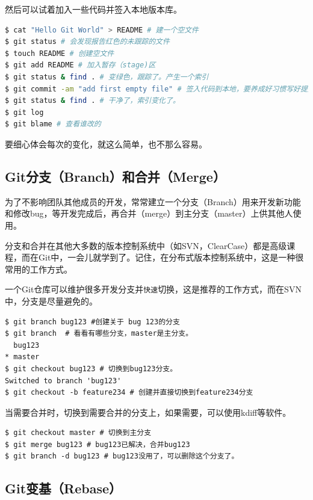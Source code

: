 然后可以试着加入一些代码并签入本地版本库。

\begin{lstlisting}[language=bash]
$ cat "Hello Git World" > README # 建一个空文件
$ git status # 会发现报告红色的未跟踪的文件
$ touch README # 创建空文件
$ git add README # 加入暂存（stage)区
$ git status & find . # 变绿色，跟踪了。产生一个索引
$ git commit -am "add first empty file" # 签入代码到本地，要养成好习惯写好提交的注释。
$ git status & find . # 干净了，索引变化了。
$ git log
$ git blame # 查看谁改的
\end{lstlisting}

要细心体会每次的变化，就这么简单，也不那么容易。

\subsection{Git分支（Branch）和合并（Merge）}
\label{git分支（branch）和合并（merge）}

为了不影响团队其他成员的开发，常常建立一个分支（Branch）用来开发新功能和修改bug，等开发完成后，再合并（merge）到主分支（master）上供其他人使用。

分支和合并在其他大多数的版本控制系统中（如SVN，ClearCase）都是高级课程，而在Git中，一会儿就学到了。记住，在分布式版本控制系统中，这是一种很常用的工作方式。

一个Git仓库可以维护很多开发分支并\texttt{快速}切换，这是推荐的工作方式，而在SVN中，分支是尽量避免的。

\begin{verbatim}
$ git branch bug123 #创建关于 bug 123的分支
$ git branch  # 看看有哪些分支，master是主分支。
  bug123
* master
$ git checkout bug123 # 切换到bug123分支。
Switched to branch 'bug123'
$ git checkout -b feature234 # 创建并直接切换到feature234分支
\end{verbatim}

当需要合并时，切换到需要合并的分支上，如果需要，可以使用kdiff等软件。

\begin{verbatim}
$ git checkout master # 切换到主分支
$ git merge bug123 # bug123已解决，合并bug123
$ git branch -d bug123 # bug123没用了，可以删除这个分支了。
\end{verbatim}

\subsection{Git变基（Rebase）}
\label{git变基（rebase）}

